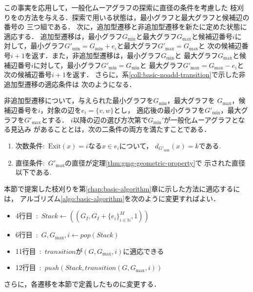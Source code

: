 この事実を応用して，一般化ムーアグラフの探索に直径の条件を考慮した
枝刈りをの方法を与える．探索で用いる状態は，最小グラフと最大グラフと候補辺の番号の
三つ組である．
次に，追加型遷移と非追加型遷移を新たに定めた状態に適応する．
追加型遷移は，最小グラフ$G_{\min}$と最大グラフ$G_{\max}$と候補辺番号$i$に
対して，最小グラフ$G'_{\min}=G_{\min}+e_i$と最大グラフ$G'_{\max}=G_{\max}$と
次の候補辺番号$i+1$を返す．また，非追加型遷移は，最小グラフ$G_{\min}$と
最大グラフ$G_{\max}$と候補辺番号$i$に対して，最小グラフ$G'_{\min}=G_{\min}$と
最大グラフ$G'_{\max}=G_{\max}-e_i$と次の候補辺番号$i+1$を返す．
さらに，系\ref{coll:basic-noadd-transition}で示した非追加型遷移の適応条件は
次のようになる．
\begin{corollary-without-proof}
  \label{coll:minmax-noadd-transition}
  \rm
  非追加型遷移について，与えられた最小グラフを$G_{\min}$，最大グラフを
  $G_{\max}$，候補辺番号を$i$，対象の辺を$e_i=\{v,w\}$とし，
  適応後の最小グラフを$G'_{\min}$，最大グラフを$G'_{\max}$とする．
  $i$以降の辺の選び方次第で$G_{\min}'$が一般化ムーアグラフとなる見込み
  があることとは，次の二条件の両方を満たすことである．
  \begin{enumerate}
  \item 次数条件:\ $\text{Exit}(x)=i$なる$x\in e_i$について，
    $d_{G'_{\min}}(x)=k$である.
  \item 直径条件:\ $G'_{\max}$の直径が定理\ref{thm:gmg-geometric-property}で
    示された直径以下である.
  \end{enumerate}
\end{corollary-without-proof}

本節で提案した枝刈りを第\ref{chap:basic-algorithm}章に示した方法に適応するには，
アルゴリズム\ref{algo:basic-algorithm}を次のように変更すればよい．
\begin{itemize}
\item 4行目\ :\ $Stack\gets((G_I,G_I+\{e_i\}^M_{i\in\mathbb{N}},1))$
\item 6行目\ :\ $G,G_{\max},i\gets pop(Stack)$
\item 11行目\ :\ $transition$が$(G,G_{\max},i)$に適応できる
\item 12行目\ :\ $push(Stack,transition(G,G_{\max},i))$
\end{itemize}
さらに，各遷移を本節で定義したものに変更する．

